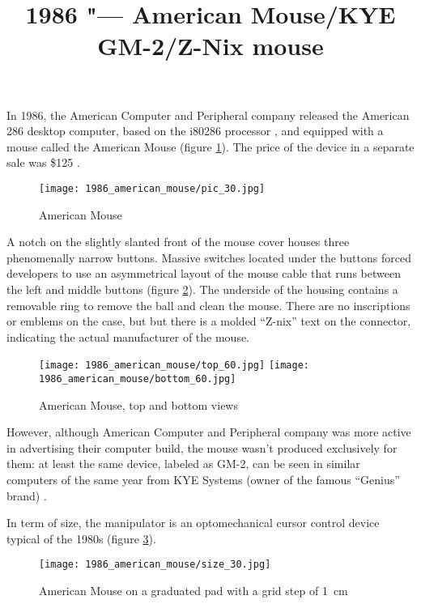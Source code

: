 \documentclass[11pt, a4paper]{article}
\begin{document}
\title{1986 "--- American Mouse/KYE GM-2/Z-Nix mouse}
\date{}
\maketitle
{}
In 1986, the American Computer and Peripheral company released the American 286 desktop computer, based on the i80286 processor \cite{adv}, and equipped with a mouse called the American Mouse (figure \ref{fig:AmericanPic}). The price of the device in a separate sale was \$125 \cite{review}.

\begin{figure}[h]
    \centering
    \texttt{[image: 1986\_american\_mouse/pic\_30.jpg]}
    \caption{American Mouse}
    \label{fig:AmericanPic}
\end{figure}

A notch on the slightly slanted front of the mouse cover houses three phenomenally narrow buttons. Massive switches located under the buttons forced developers to use an asymmetrical layout of the mouse cable that runs between the left and middle buttons (figure \ref{AmericanTopAndBottom}). The underside of the housing contains a removable ring to remove the ball and clean the mouse. There are no inscriptions or emblems on the case, but but there is a molded ``Z-nix'' text on the connector, indicating the actual manufacturer of the mouse.

\begin{figure}[h!]
    \centering
    \texttt{[image: 1986\_american\_mouse/top\_60.jpg]}
    \texttt{[image: 1986\_american\_mouse/bottom\_60.jpg]}
    \caption{American Mouse, top and bottom views}
    \label{AmericanTopAndBottom}
\end{figure}

However, although American Computer and Peripheral company was more active in advertising their computer build, the mouse wasn't produced exclusively for them: at least the same device, labeled as GM-2, can be seen in similar computers of the same year from KYE Systems (owner of the famous ``Genius'' brand) \cite{kye}.

In term of size, the manipulator is an optomechanical cursor control device typical of the 1980s (figure \ref{fig:AmericanSize}).

\begin{figure}[h]
    \centering
    \texttt{[image: 1986\_american\_mouse/size\_30.jpg]}
    \caption{American Mouse on a graduated pad with a grid step of 1~cm}
    \label{fig:AmericanSize}
\end{figure}
\end{document}
